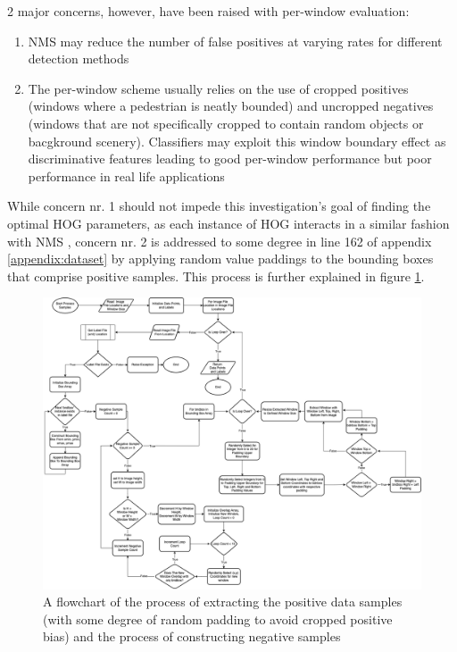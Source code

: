 2 major concerns, however, have been raised with per-window evaluation: 
\begin{enumerate}
    \item NMS may reduce the number of false positives at varying rates for different detection methods \cite{dollar_2009_pedestrian}
    \item The per-window scheme usually relies on the use of cropped positives (windows where a pedestrian is neatly bounded) and uncropped negatives (windows that are not specifically cropped to contain random objects or bacgkround scenery). Classifiers may exploit this window boundary effect as discriminative features leading to good per-window performance but poor performance in real life applications \cite{dollar_2009_pedestrian}
\end{enumerate} 

While concern nr. 1 should not impede this investigation's goal of finding the optimal HOG parameters, as each instance of HOG interacts in a similar fashion with NMS \cite{dalal_2005_histograms}, concern nr. 2 is addressed to some degree in line 162 of appendix \ref{appendix:dataset} by applying random value paddings to the bounding boxes that comprise positive samples. This process is further explained in figure \ref{fig:dataset_low}.

\begin{figure}
    \centering
    \includegraphics[width=\linewidth]{images/ee_dataset_low.drawio (1).png}
    \caption{A flowchart of the process of extracting the positive data samples (with some degree of random padding to avoid cropped positive bias) and the process of constructing negative samples }
    \label{fig:dataset_low}
\end{figure}

